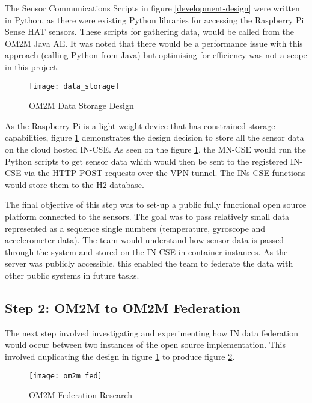 The Sensor Communications Scripts in figure \ref{development-design} were written in Python, as there were existing Python libraries for accessing the Raspberry Pi Sense HAT sensors. These scripts for gathering data, would be called from the OM2M Java AE. It was noted that there would be a performance issue with this approach (calling Python from Java) but optimising for efficiency was not a scope in this project.

\begin{figure}[H]
  \centering
  \texttt{[image: data\_storage]}
  \caption{OM2M Data Storage Design}
  \label{data-storage-design}
\end{figure}

As the Raspberry Pi is a light weight device that has constrained storage capabilities, figure \ref{data-storage-design} demonstrates the design decision to store all the sensor data on the cloud hosted IN-CSE. As seen on the figure \ref{data-storage-design}, the MN-CSE would run the Python scripts to get sensor data which would then be sent to the registered IN-CSE via the HTTP POST requests over the VPN tunnel. The INs CSE functions would store them to the H2 database. 

The final objective of this step was to set-up a public fully functional open source platform connected to the sensors. The goal was to pass relatively small data represented as a sequence single numbers (temperature, gyroscope and accelerometer data). The team would understand how sensor data is passed through the system and stored on the IN-CSE in container instances. As the server was publicly accessible, this enabled the team to federate the data with other public systems in future tasks.

\subsection{Step 2: OM2M to OM2M Federation}
\label{step2}

The next step involved investigating and experimenting how IN data federation would occur between two instances of the open source implementation. This involved duplicating the design in figure \ref{data-storage-design} to produce figure \ref{federation-research}.   

\begin{figure}[H]
  \centering
  \texttt{[image: om2m\_fed]}
  \caption{OM2M Federation Research}
  \label{federation-research}
\end{figure}

